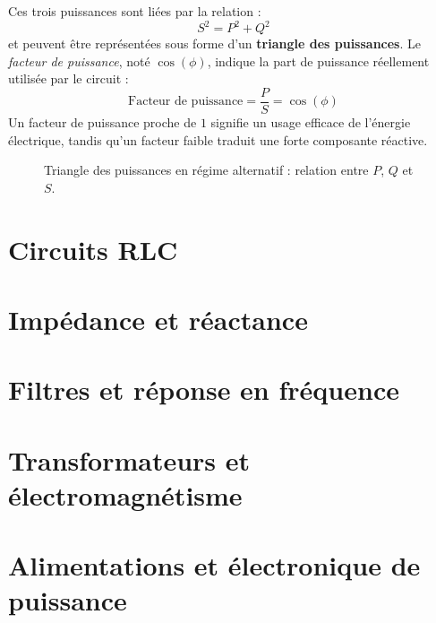 Ces trois puissances sont li\'ees par la relation :
\[
S^2 = P^2 + Q^2
\]
et peuvent être repr\'esent\'ees sous forme d’un \textbf{triangle des puissances}.
Le \emph{facteur de puissance}, not\'e $\cos(\phi)$, indique la part de puissance r\'eellement utilis\'ee par le circuit :
\[
\text{Facteur de puissance} = \frac{P}{S} = \cos(\phi)
\]
Un facteur de puissance proche de \(1\) signifie un usage efficace de l’\'energie \'electrique, tandis qu’un facteur faible traduit une forte composante r\'eactive.
\begin{figure}[h!]
\centering
{}
\caption{Triangle des puissances en r\'egime alternatif : relation entre $P$, $Q$ et $S$.}
\label{fig:triangle_puissances}
\end{figure}


\section{Circuits RLC} \label{subsec:rlc_circuits}
\section{Imp\'edance et r\'eactance} \label{subsec:impedance_reactance}
\section{Filtres et r\'eponse en fr\'equence} \label{subsec:filters}
\section{Transformateurs et \'electromagn\'etisme} \label{subsec:transformers}
\section{Alimentations et \'electronique de puissance} \label{subsec:power_supplies}
